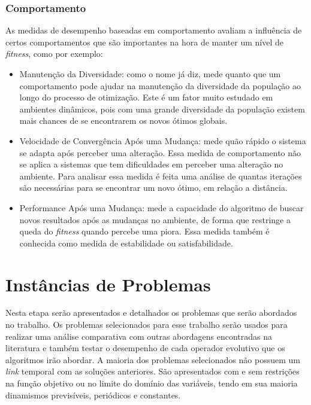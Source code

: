 \subsubsection{Comportamento}
As medidas de desempenho baseadas em comportamento avaliam a influência de certos comportamentos que são importantes na hora de manter um nível de \textit{fitness}, como por exemplo:

\begin{itemize}
\item Manutenção da Diversidade: como o nome já diz, mede quanto que um comportamento pode ajudar na manutenção da diversidade da população ao longo do processo de otimização. Este é um fator muito estudado em ambientes dinâmicos, pois com uma grande diversidade da população existem mais chances de se encontrarem os novos ótimos globais.

\item Velocidade de Convergência Após uma Mudança: mede quão rápido o sistema se adapta após perceber uma alteração. Essa medida de comportamento não se aplica a sistemas que tem dificuldades em perceber uma alteração no ambiente. Para analisar essa medida é feita uma análise de quantas iterações são necessárias para se encontrar um novo ótimo, em relação a distância.

\item Performance Após uma Mudança: mede a capacidade do algoritmo de buscar novos resultados após as mudanças no ambiente, de forma que restringe a queda do \textit{fitness} quando percebe uma piora. Essa medida também é conhecida como medida de estabilidade ou satisfabilidade.
\end{itemize}

\section{Instâncias de Problemas}
\label{sec:revisao_dinamic_problems}
Nesta etapa serão apresentados e detalhados os problemas que serão abordados no trabalho. Os problemas selecionados para esse trabalho serão usados para realizar uma análise comparativa com outras abordagens encontradas na literatura e também testar o desempenho de cada operador evolutivo que os algoritmos irão abordar.
A maioria dos problemas selecionados não possuem um \textit{link} temporal com as soluções anteriores. São apresentados com e sem restrições na função objetivo ou no limite do domínio das variáveis, tendo em sua maioria dinamismos previsíveis, periódicos e constantes.


